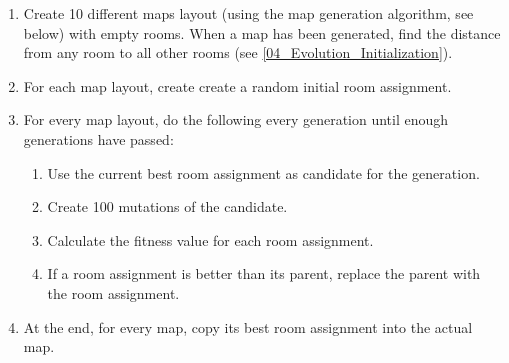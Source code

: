 \begin{enumerate}

	\item Create 10 different maps layout (using the map generation algorithm, see below) with empty rooms. When a map has been generated, find the distance from any room to all other rooms (see \ref{04_Evolution_Initialization}).

	\item For each map layout, create create a random initial room assignment.

	\item For every map layout, do the following every generation until enough generations have passed:

	\begin{enumerate}

		\item Use the current best room assignment as candidate for the generation.

		\item Create 100 mutations of the candidate.

		\item Calculate the fitness value for each room assignment.

		\item If a room assignment is better than its parent, replace the parent with the room assignment.

	\end{enumerate}

	\item At the end, for every map, copy its best room assignment into the actual map.

\end{enumerate}









